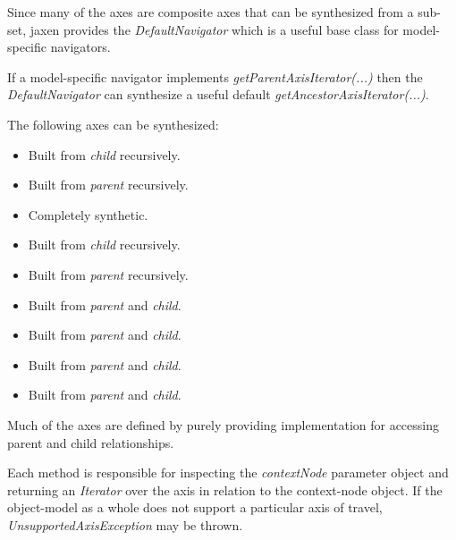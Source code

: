 \documentclass[20pt,landscape,headrule,footrule]{foils}
\begin{document}

Since many of the axes are composite axes that can be synthesized
from a sub-set, jaxen provides the \emph{DefaultNavigator} which
is a useful base class for model-specific navigators.

If a model-specific navigator implements
\emph{getParentAxisIterator(...)}
then the \emph{DefaultNavigator} can synthesize a useful
default \emph{getAncestorAxisIterator(...)}.


The following axes can be synthesized:

\begin{minipage}{\textwidth}
\small
\begin{itemize}
  \item {} Built from \emph{child} recursively.
  \item {} Built from \emph{parent} recursively.
  \item {} Completely synthetic.
  \item {} Built from \emph{child} recursively.
  \item {} Built from \emph{parent} recursively.
  \item {} Built from \emph{parent} and \emph{child}.
  \item {} Built from \emph{parent} and \emph{child}.
  \item {} Built from \emph{parent} and \emph{child}.
  \item {} Built from \emph{parent} and \emph{child}.
\end{itemize}

Much of the axes are defined by purely providing implementation for
accessing parent and child relationships.
\end{minipage}





Each method is responsible for inspecting the \emph{contextNode}
parameter object and returning an \emph{Iterator} over the axis
in relation to the context-node object.  If the object-model as a
whole does not support a particular axis of travel,
\emph{UnsupportedAxisException} may be thrown.
\end{document}

